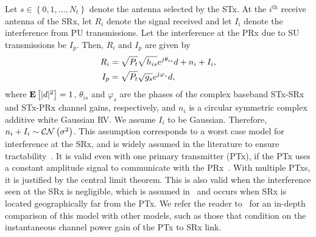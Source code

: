 \documentclass[12pt,draftcls,peerreview,onecolumn]{IEEEtran}
\newcommand{\CN}{{\cal CN}}
\newcommand{\expect}[1]{{\bf{E}}\left[{#1}\right]}
\newcommand{\nx}{{0}}
\newcommand{\Nt}{{N_t}}
\newcommand{\Pt}{{P_t}}
\newcommand{\such}{h}
\newcommand{\puch}{g}
\newcommand{\hk}[1]{{\such_{#1}}}
\newcommand{\gk}[1]{{\puch_{#1}}}
\newcommand{\Rsrx}{R_{i}}
\newcommand{\Iprx}{I_{p}}
\newcommand{\Isrx}{I_{i}}
\newcommand{\noise}{n_i}
\newcommand{\noisevar}{\sigma^2}
\newcommand{\allopts}{\left\{\nx,1,\ldots,\Nt\right\}}
\newcommand{\suchph}{\theta}
\newcommand{\puchph}{\varphi}
\newcommand{\thetahk}{\suchph_{is}}
\newcommand{\thetagk}{\puchph_{s}}
\newcommand{\ith}{i^{\text{th}}}
\begin{document}
Let $s\in\allopts$ denote the antenna selected by the STx. %
 At the $\ith$ receive antenna of the SRx, let $\Rsrx$ denote the signal received and let $\Isrx$ denote the interference from PU transmissions. Let the interference at the PRx due to SU transmissions be $\Iprx$. Then, $\Rsrx$ and $\Iprx$ are given by
%
\begin{align}
\label{eq:r_su}
 \Rsrx &= \sqrt{\Pt}\sqrt{\hk{is}} e^{j\thetahk} \datasymbol + \noise + \Isrx, \\
 \label{eq:i}
 \Iprx &= \sqrt{\Pt}\sqrt{\gk{s}} e^{j\thetagk} \datasymbol ,
\end{align}
%
where $\expect{|\datasymbol|^2}=1$, $\thetahk$ and $\thetagk$ are the phases of the complex baseband STx-SRx and STx-PRx channel gains, respectively, and $\noise$ is a circular symmetric complex additive white Gaussian RV. We assume $\Isrx$ to be Gaussian. Therefore, $\noise + \Isrx\sim \CN\left(\noisevar\right)$. This assumption corresponds to a worst case model for interference at the SRx, and is widely assumed in the literature to ensure tractability~\cite{Sarvendranath_2013_TCOM,Wang_2011_TCom, Kashyap_2014_TCOM,Sarvendranath_2014_TCOM}. It is valid even with one primary transmitter (PTx), if the PTx uses a constant amplitude signal to communicate with the PRx~\cite{Kashyap_2014_TCOM}. With multiple PTxs, it is justified by the central limit theorem. This is also valid when the interference seen at the SRx is negligible, which is assumed in~\cite{musavian_2009_tcom,RZhang_2009_TWC,li_2011_pimrc} and occurs when SRx is located geographically far from the PTx. We refer the reader to~\cite{das_2015_twc} for an in-depth comparison of this model with other models, such as those that condition on the instantaneous channel power gain of the PTx to SRx link. 
\end{document}
